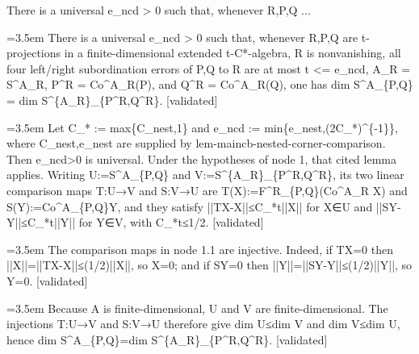 \documentclass{article}
\newcommand{\step}[1]{\par\noindent\hangindent=3.5em\hangafter=1%
  \makebox[3.5em][l]{\textbf{#1.}}}
\newcommand{\steptag}[1]{\hfill{\small\textsf{[#1]}}}
\begin{document}
\begin{proofbox}{There is a universal e\_ncd > 0 such that, whenever R,P,Q ...}
\step{1} There is a universal e\_ncd > 0 such that, whenever R,P,Q are t-projections in a finite-dimensional extended t-C*-algebra, R is nonvanishing, all four left/right subordination errors of P,Q to R are at most t <= e\_ncd, A\_R = S\textasciicircum{}A\_R, P\textasciicircum{}R = Co\textasciicircum{}A\_R(P), and Q\textasciicircum{}R = Co\textasciicircum{}A\_R(Q), one has dim S\textasciicircum{}A\_\{P,Q\} = dim S\textasciicircum{}\{A\_R\}\_\{P\textasciicircum{}R,Q\textasciicircum{}R\}. \steptag{validated} \\[6pt]
\step{1.1} Let C\_* := max\{C\_nest,1\} and e\_ncd := min\{e\_nest,(2C\_*)\textasciicircum{}\{-1\}\}, where C\_nest,e\_nest are supplied by lem-maincb-nested-corner-comparison. Then e\_ncd>0 is universal. Under the hypotheses of node 1, that cited lemma applies. Writing U:=S\textasciicircum{}A\_\{P,Q\} and V:=S\textasciicircum{}\{A\_R\}\_\{P\textasciicircum{}R,Q\textasciicircum{}R\}, its two linear comparison maps T:U→V and S:V→U are T(X):=F\textasciicircum{}R\_\{P,Q\}(Co\textasciicircum{}A\_R X) and S(Y):=Co\textasciicircum{}A\_\{P,Q\}Y, and they satisfy ||TX-X||≤C\_*t||X|| for X∈U and ||SY-Y||≤C\_*t||Y|| for Y∈V, with C\_*t≤1/2. \steptag{validated} \\[4pt]
\step{1.2} The comparison maps in node 1.1 are injective. Indeed, if TX=0 then ||X||=||TX-X||≤(1/2)||X||, so X=0; and if SY=0 then ||Y||=||SY-Y||≤(1/2)||Y||, so Y=0. \steptag{validated} \\[4pt]
\step{1.3} Because A is finite-dimensional, U and V are finite-dimensional. The injections T:U→V and S:V→U therefore give dim U≤dim V and dim V≤dim U, hence dim S\textasciicircum{}A\_\{P,Q\}=dim S\textasciicircum{}\{A\_R\}\_\{P\textasciicircum{}R,Q\textasciicircum{}R\}. \steptag{validated} \\[4pt]
\end{proofbox}
\end{document}

